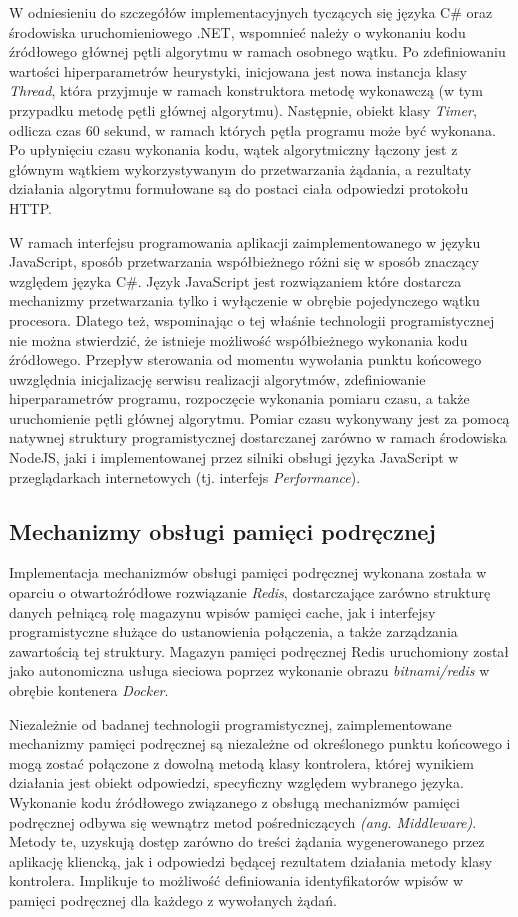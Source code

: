 W odniesieniu do szczegółów implementacyjnych tyczących się języka C\# oraz środowiska uruchomieniowego .NET, wspomnieć należy o wykonaniu kodu źródłowego głównej pętli algorytmu w ramach osobnego wątku. Po zdefiniowaniu wartości hiperparametrów heurystyki, inicjowana jest nowa instancja klasy \textit{Thread}, która przyjmuje w ramach konstruktora metodę wykonawczą (w tym przypadku metodę pętli głównej algorytmu). Następnie, obiekt klasy \textit{Timer}, odlicza czas 60 sekund, w ramach których pętla programu może być wykonana. Po upłynięciu czasu wykonania kodu, wątek algorytmiczny łączony jest z głównym wątkiem wykorzystywanym do przetwarzania żądania, a rezultaty działania algorytmu formułowane są do postaci ciała odpowiedzi protokołu HTTP.  


W ramach interfejsu programowania aplikacji zaimplementowanego w języku JavaScript, sposób przetwarzania współbieżnego różni się w sposób znaczący względem języka C\#. Język JavaScript jest rozwiązaniem które dostarcza mechanizmy przetwarzania tylko i wyłączenie w obrębie pojedynczego wątku procesora. Dlatego też, wspominając o tej właśnie technologii programistycznej nie można stwierdzić, że istnieje możliwość współbieżnego wykonania kodu źródłowego. Przepływ sterowania od momentu wywołania punktu końcowego uwzględnia inicjalizację serwisu realizacji algorytmów, zdefiniowanie hiperparametrów programu, rozpoczęcie wykonania pomiaru czasu, a także uruchomienie pętli głównej algorytmu. Pomiar czasu wykonywany jest za pomocą natywnej struktury programistycznej dostarczanej zarówno w ramach środowiska NodeJS, jaki i implementowanej przez silniki obsługi języka JavaScript w przeglądarkach internetowych (tj. interfejs \textit{Performance}).
\subsection*{Mechanizmy obsługi pamięci podręcznej}
\label{sec:mechanizmy-cache}
Implementacja mechanizmów obsługi pamięci podręcznej wykonana została w oparciu o otwartoźródłowe rozwiązanie \textit{Redis}, dostarczające zarówno strukturę danych pełniącą rolę magazynu wpisów pamięci cache, jak i interfejsy programistyczne służące do ustanowienia połączenia, a także zarządzania zawartością tej struktury. Magazyn pamięci podręcznej Redis uruchomiony został jako autonomiczna usługa sieciowa poprzez wykonanie obrazu \textit{bitnami/redis} w obrębie kontenera \textit{Docker}.

Niezależnie od badanej technologii programistycznej, zaimplementowane mechanizmy pamięci podręcznej są niezależne od określonego punktu końcowego i mogą zostać połączone z dowolną metodą klasy kontrolera, której wynikiem działania jest obiekt odpowiedzi, specyficzny względem wybranego języka. Wykonanie kodu źródłowego związanego z obsługą mechanizmów pamięci podręcznej odbywa się wewnątrz metod pośredniczących \textit{(ang. Middleware)}. Metody te, uzyskują dostęp zarówno do treści żądania wygenerowanego przez aplikację kliencką, jak i odpowiedzi będącej rezultatem działania metody klasy kontrolera. Implikuje to możliwość definiowania identyfikatorów wpisów w pamięci podręcznej dla każdego z wywołanych żądań.

